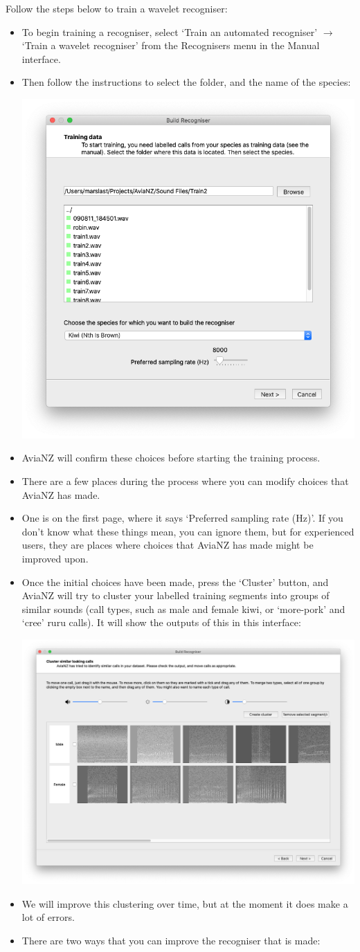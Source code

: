 \documentclass{article}
\begin{document}
Follow the steps below to train a wavelet recogniser:
\begin{itemize}
\item To begin training a recogniser, select `Train an automated recogniser' $\rightarrow$ `Train a wavelet recogniser' from the Recognisers menu in the Manual interface. 
\item Then follow the instructions to select the folder, and the name of the species:
\begin{center}
    \includegraphics[width=.4\textwidth]{Figures/BuildRecogniser1}
\end{center}

\item AviaNZ will confirm these choices before starting the training process. 
\item There are a few places during the process where you can modify choices that AviaNZ has made. 
\item One is on the first page, where it says `Preferred sampling rate (Hz)'. If you don't know what these things mean, you can ignore them, but for experienced users, they are places where choices that AviaNZ has made might be improved upon. 
\item Once the initial choices have been made, press the `Cluster' button, and AviaNZ will try to cluster your labelled training segments into groups of similar sounds (call types, such as male and female kiwi, or `more-pork' and `cree' ruru calls). It will show the outputs of this in this interface:
\begin{center}
    \includegraphics[width=.6\textwidth]{Figures/BuildRecogniser2}
\end{center}
\item We will improve this clustering over time, but at the moment it does make a lot of errors. 
\item There are two ways that you can improve the recogniser that is made:


\end{itemize}
\end{document}
